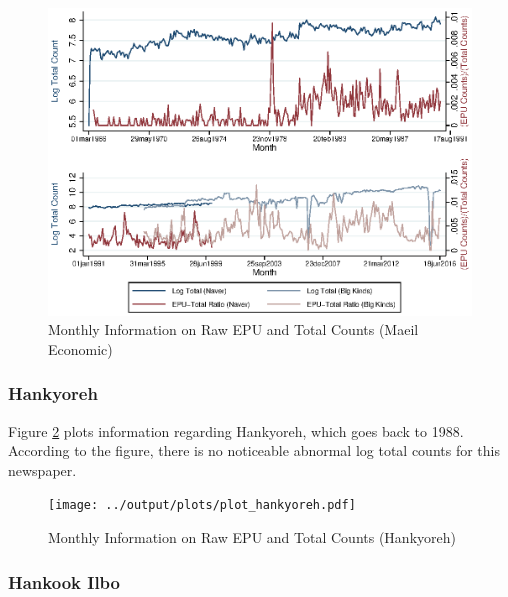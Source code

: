 \begin{landscape}
\begin{figure}[H] \caption{Monthly Information on Raw EPU and Total Counts (Maeil Economic)} \label{fig:maeil}
\begin{center}
\includegraphics[scale=1.45]{../output/plots/plot_maeil_combined.eps} 
\end{center}
\end{figure}
\end{landscape}


\subsubsection{Hankyoreh}

Figure \ref{fig:hankyoreh} plots information regarding Hankyoreh, which goes back to 1988. According to the figure, there is no noticeable abnormal log total counts for this newspaper. 

\begin{landscape}
\begin{figure}[H] \caption{Monthly Information on Raw EPU and Total Counts (Hankyoreh)} \label{fig:hankyoreh}
\begin{center}
\texttt{[image: ../output/plots/plot\_hankyoreh.pdf]} 
\end{center}
\end{figure}
\end{landscape}



\subsubsection{Hankook Ilbo}

